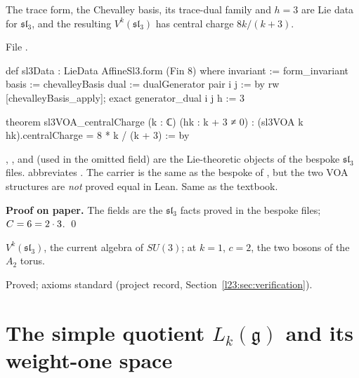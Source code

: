 \begin{proposition}\label{l23:prop:sl3}
The trace form, the Chevalley basis, its trace-dual family and $h=3$ are Lie data for $\mathfrak{sl}_3$, and the resulting
$V^k(\mathfrak{sl}_3)$ has central charge $8k/(k+3)$.
\end{proposition}
\noindent File .
\begin{leancode}
def sl3Data : LieData AffineSl3.form (Fin 8) where
  invariant := form_invariant
  basis := chevalleyBasis
  dual := dualGenerator
  pair i j := by rw [chevalleyBasis_apply]; exact generator_dual i j
  h := 3

theorem sl3VOA_centralCharge (k : ℂ) (hk : k + 3 ≠ 0) :
    (sl3VOA k hk).centralCharge = 8 * k / (k + 3) := by
\end{leancode}

\begin{dictionary}
, ,  and  (used in the omitted
 field) are the Lie-theoretic objects of the bespoke $\mathfrak{sl}_3$ files.  abbreviates
. The carrier is the same  as the bespoke  of
, but the two VOA structures are \emph{not} proved equal in Lean. Same as the textbook.
\end{dictionary}

\textbf{Proof on paper.} The fields are the $\mathfrak{sl}_3$ facts proved in the bespoke files; $C=6=2\cdot3$. \qed

\begin{physics}
$V^k(\mathfrak{sl}_3)$, the current algebra of $SU(3)$; at $k=1$, $c=2$, the two bosons of the $A_2$ torus.
\end{physics}

\begin{status}
Proved; axioms standard (project record, Section~\ref{l23:sec:verification}).
\end{status}

\section{The simple quotient \texorpdfstring{$L_k(\mathfrak g)$}{L\_k(g)} and its weight-one space}\label{l23:sec:simple}

